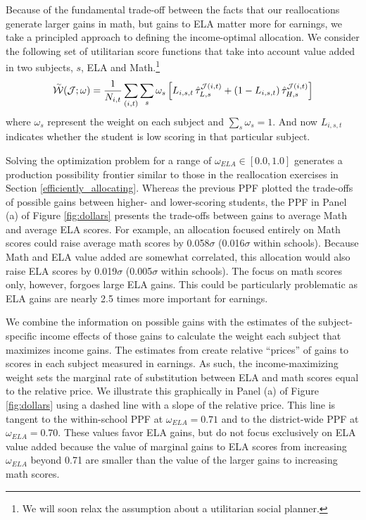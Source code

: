 \documentclass[12pt]{article}
\theoremstyle{definition}
\theoremstyle{definition}
\theoremstyle{definition}
\theoremstyle{definition}
\begin{document}
Because of the fundamental trade-off between the facts that our reallocations generate larger gains in math, but gains to ELA matter more for earnings, we take a principled approach to defining the income-optimal allocation. We consider the following set of utilitarian score functions that take into account value added in two subjects, $s$, ELA and Math.\footnote{We will soon relax the assumption about a utilitarian social planner.}
\begin{equation}
\accentset{\sim}{\mathcal{W}}(\mathcal{J};\omega) =  \frac{1}{N_{i,t}}\sum_{(i,t)} \sum_{s} \omega_s \left [ L_{i,s,t} \,\hat{\tau}^{\mathcal{J}(i,t)}_{L,s}  + (1-L_{i,s,t}) \, \hat{\tau}^{\mathcal{J}(i,t)}_{H,s} \right ]
\end{equation}
\noindent where $\omega_s$ represent the weight on each subject and $\sum_s \omega_s = 1$. And now $L_{i,s,t}$ indicates whether the student is low scoring in that particular subject.

Solving the optimization problem for a range of $\omega_{ELA}\in[0.0,1.0]$ generates a production possibility frontier similar to those in the reallocation exercises in Section \ref{efficiently_allocating}. Whereas the previous PPF plotted the trade-offs of possible gains between higher- and lower-scoring students, the PPF in Panel (a) of Figure \ref{fig:dollars} presents the trade-offs between gains to average Math and average ELA scores. For example, an allocation focused entirely on Math scores could raise average math scores by 0.058$\sigma$ (0.016$\sigma$ within schools).  Because Math and ELA value added are somewhat correlated, this allocation would also raise ELA scores by 0.019$\sigma$ (0.005$\sigma$ within schools). The focus on math scores only, however, forgoes large ELA gains. This could be particularly problematic as ELA gains are nearly 2.5 times more important for earnings.


We combine the information on possible gains with the estimates of the subject-specific income effects of those gains to calculate the weight each subject that maximizes income gains. The estimates from \citet{chetty2014measuring1} create relative ``prices'' of gains to scores in each subject measured in earnings. As such, the income-maximizing weight sets the marginal rate of substitution between ELA and math scores equal to the relative price. We illustrate this graphically in Panel (a) of Figure \ref{fig:dollars} using a dashed line with a slope of the relative price. This line is tangent to the within-school PPF at $\omega_{ELA}=0.71$ and to the district-wide PPF at $\omega_{ELA}=0.70$. %
These values favor ELA gains, but do not focus exclusively on ELA value added because the value of marginal gains to ELA scores from increasing $\omega_{ELA}$ beyond 0.71 are smaller than the value of the larger gains to increasing math scores.
\end{document}
